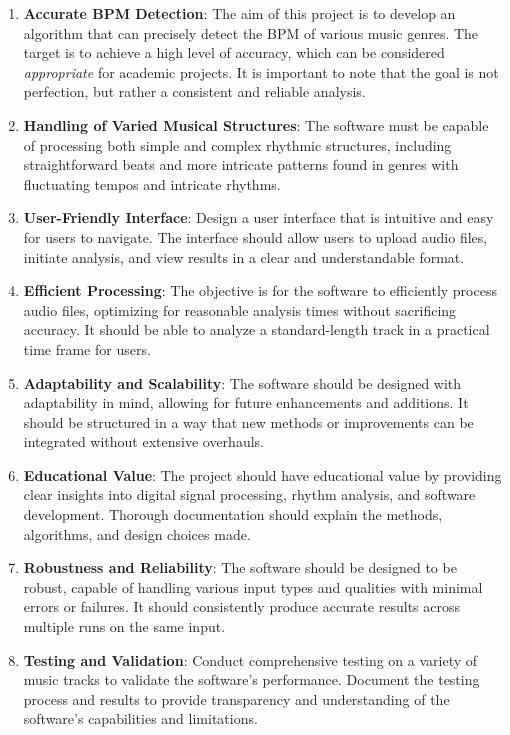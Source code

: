 \documentclass[a4paper,12pt,oneside]{article}
\begin{document}
\begin{enumerate}
\def\labelenumi{\arabic{enumi}.}
\item
    \textbf{Accurate BPM Detection}: The aim of this project is to develop an
  algorithm that can precisely detect the BPM of various music genres.
  The target is to achieve a high level of accuracy, which can be
  considered \emph{appropriate} for academic projects. It is important
  to note that the goal is not perfection, but rather a consistent and
  reliable analysis.
\item
  \textbf{Handling of Varied Musical Structures}: The software must be capable of
  processing both simple and complex rhythmic structures, including
  straightforward beats and more intricate patterns found in genres with
  fluctuating tempos and intricate rhythms.
\item
  \textbf{User-Friendly Interface}: Design a user interface that is intuitive and
  easy for users to navigate. The interface should allow users to upload
  audio files, initiate analysis, and view results in a clear and
  understandable format.
\item
  \textbf{Efficient Processing}: The objective is for the software to efficiently
  process audio files, optimizing for reasonable analysis times without
  sacrificing accuracy. It should be able to analyze a standard-length
  track in a practical time frame for users.
\item
  \textbf{Adaptability and Scalability}: The software should be designed with
  adaptability in mind, allowing for future enhancements and additions.
  It should be structured in a way that new methods or improvements can
  be integrated without extensive overhauls.
\item
  \textbf{Educational Value}: The project should have educational value by
  providing clear insights into digital signal processing, rhythm
  analysis, and software development. Thorough documentation should
  explain the methods, algorithms, and design choices made.
\item
  \textbf{Robustness and Reliability}: The software should be designed to be
  robust, capable of handling various input types and qualities with
  minimal errors or failures. It should consistently produce accurate
  results across multiple runs on the same input.
\item
  \textbf{Testing and Validation}: Conduct comprehensive testing on a variety of
  music tracks to validate the software's performance. Document the
  testing process and results to provide transparency and understanding
  of the software's capabilities and limitations.
\end{enumerate}
\end{document}
